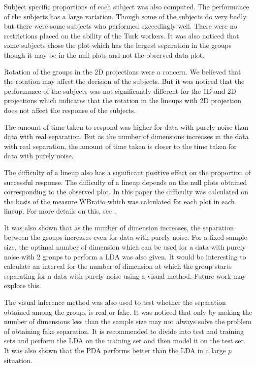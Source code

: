 \documentclass[12]{article}
\begin{document}
Subject specific proportions of each subject was also computed. The performance of the subjects has a large variation. Though some of the subjects do very badly, but there were some subjects who performed exceedingly well. There were no restrictions  placed on the ability of the Turk workers. It was also noticed that some subjects chose the plot which has the largest separation in the groups though it may be in the null plots and not the observed data plot.

Rotation of the groups in the 2D projections were a concern. We believed that the rotation may affect the decision of the subjects. But it was noticed that the performance of the subjects was not significantly different for the 1D and 2D projections which indicates that the rotation in the lineups with 2D projection does not affect the response of the subjects. 

The amount of time taken to respond was higher for data with purely noise than data with real separation. But as the number of dimensions increases in the data with real separation, the amount of time taken is closer to the time taken for data with purely noise.

The difficulty of a lineup also has a significant positive effect on the proportion of successful response. The difficulty of a lineup depends on the null plots obtained corresponding to the observed plot. In this paper the difficulty was calculated on the basis of the measure WBratio which was calculated for each plot in each lineup. For more details on this, see \cite{roychowdhury:2012}.
 
It was also shown that as the number of dimension increases, the separation between the groups increases even for data with purely noise. For a fixed sample size, the optimal number of dimension which can be used for a data with purely noise with 2 groups to perform a LDA was also given. It would be interesting to calculate an interval for the number of dimension at which the group starts separating for a data with purely noise using a visual method. Future work may explore this.

The visual inference method was also used to test whether the separation obtained among the groups is real or fake. It was noticed that only by making the number of dimensions less than the sample size may not always solve the problem of obtaining fake separation. It is recommended to divide into test and training sets and perform the LDA on the training set and then model it on the test set. It was also shown that the PDA performs better than the LDA in a large $p$ situation.
\end{document}
